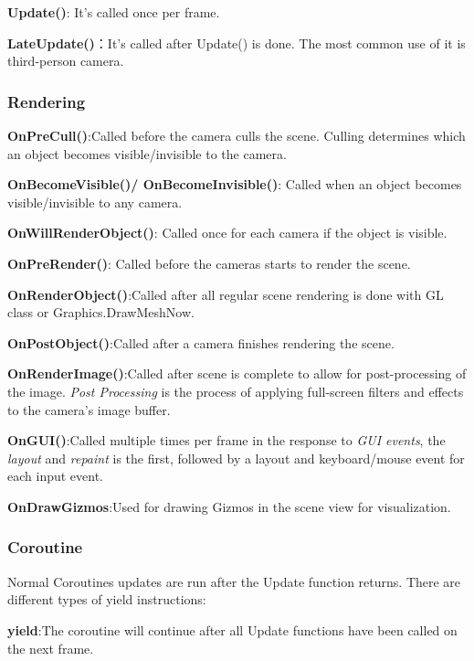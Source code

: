 \documentclass[10pt, a4paper]{article}
\begin{document}
                \textbf{Update()}: It's called once per frame. 

                \textbf{LateUpdate()}：It's called after Update() is done. The most common use of it is third-person camera.

            \subsubsection{Rendering}
                \textbf{OnPreCull()}:Called before the camera culls the scene. Culling determines which an object becomes visible/invisible to the camera. 
                
                \textbf{OnBecomeVisible()/ OnBecomeInvisible()}: Called when an object becomes visible/invisible to any camera. 

                \textbf{OnWillRenderObject()}: Called once for each camera if the object is visible. 

                \textbf{OnPreRender()}: Called before the cameras starts to render the scene. 
                
                \textbf{OnRenderObject()}:Called after all regular scene rendering is done with GL class or Graphics.DrawMeshNow. 
                
                \textbf{OnPostObject()}:Called after a camera finishes rendering the scene. 

                \textbf{OnRenderImage()}:Called after scene is complete to allow for post-processing of the image. \emph{Post Processing} is the process of applying full-screen filters and effects to the camera's image buffer.
                
                \textbf{OnGUI()}:Called multiple times per frame in the response to \emph{GUI events}, the \emph{layout} and \emph{repaint} is the first, followed by a layout and keyboard/mouse event for each input event. 
                
                \textbf{OnDrawGizmos}:Used for drawing Gizmos in the scene view for visualization.
            \subsubsection{Coroutine}
                Normal Coroutines updates are run after the Update function returns. There are different types of yield instructions: 
                
                \textbf{yield}:The coroutine will continue after all Update functions have been called on the next frame.
\end{document}
